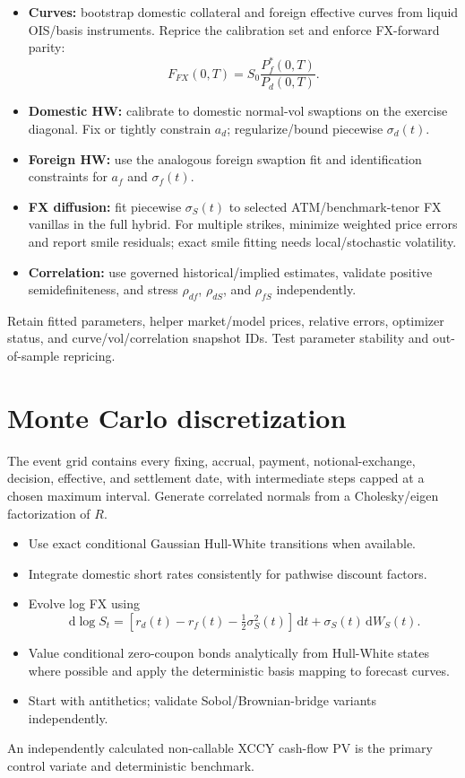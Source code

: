 \documentclass[conference]{IEEEtran}
\newcommand{\dd}{\,\mathrm{d}}
\begin{document}
\begin{itemize}
  \item \textbf{Curves:} bootstrap domestic collateral and foreign effective curves from liquid OIS/basis instruments. Reprice the calibration set and enforce FX-forward parity:
  \[
    F_{FX}(0,T)=S_0\frac{P_f^{*}(0,T)}{P_d(0,T)}.
  \]
  \item \textbf{Domestic HW:} calibrate to domestic normal-vol swaptions on the exercise diagonal. Fix or tightly constrain $a_d$; regularize/bound piecewise $\sigma_d(t)$.
  \item \textbf{Foreign HW:} use the analogous foreign swaption fit and identification constraints for $a_f$ and $\sigma_f(t)$.
  \item \textbf{FX diffusion:} fit piecewise $\sigma_S(t)$ to selected ATM/benchmark-tenor FX vanillas in the full hybrid. For multiple strikes, minimize weighted price errors and report smile residuals; exact smile fitting needs local/stochastic volatility.
  \item \textbf{Correlation:} use governed historical/implied estimates, validate positive semidefiniteness, and stress $\rho_{df}$, $\rho_{dS}$, and $\rho_{fS}$ independently.
\end{itemize}
Retain fitted parameters, helper market/model prices, relative errors, optimizer status, and curve/vol/correlation snapshot IDs. Test parameter stability and out-of-sample repricing.

\section{Monte Carlo discretization}

The event grid contains every fixing, accrual, payment, notional-exchange, decision, effective, and settlement date, with intermediate steps capped at a chosen maximum interval. Generate correlated normals from a Cholesky/eigen factorization of $R$.
\begin{itemize}
  \item Use exact conditional Gaussian Hull-White transitions when available.
  \item Integrate domestic short rates consistently for pathwise discount factors.
  \item Evolve log FX using
  \[
    \dd\log S_t=\left[r_d(t)-r_f(t)-\tfrac12\sigma_S^2(t)\right]\dd t+\sigma_S(t)\dd W_S(t).
  \]
  \item Value conditional zero-coupon bonds analytically from Hull-White states where possible and apply the deterministic basis mapping to forecast curves.
  \item Start with antithetics; validate Sobol/Brownian-bridge variants independently.
\end{itemize}
An independently calculated non-callable XCCY cash-flow PV is the primary control variate and deterministic benchmark.
\end{document}
